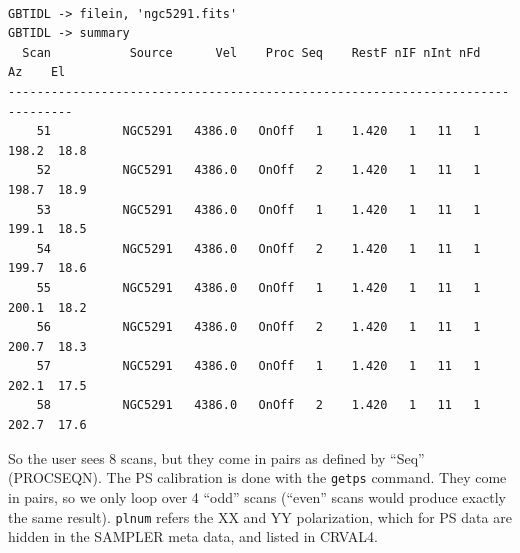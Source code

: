 \documentclass[12pt,a4paper]{article}
\begin{document}
\footnotesize
\begin{lstlisting}

GBTIDL -> filein, 'ngc5291.fits' 
GBTIDL -> summary
  Scan           Source      Vel    Proc Seq    RestF nIF nInt nFd     Az    El
-------------------------------------------------------------------------------
    51          NGC5291   4386.0   OnOff   1    1.420   1   11   1  198.2  18.8
    52          NGC5291   4386.0   OnOff   2    1.420   1   11   1  198.7  18.9
    53          NGC5291   4386.0   OnOff   1    1.420   1   11   1  199.1  18.5
    54          NGC5291   4386.0   OnOff   2    1.420   1   11   1  199.7  18.6
    55          NGC5291   4386.0   OnOff   1    1.420   1   11   1  200.1  18.2
    56          NGC5291   4386.0   OnOff   2    1.420   1   11   1  200.7  18.3
    57          NGC5291   4386.0   OnOff   1    1.420   1   11   1  202.1  17.5
    58          NGC5291   4386.0   OnOff   2    1.420   1   11   1  202.7  17.6
\end{lstlisting}
\normalsize

So the user sees 8 scans, but they come in pairs as defined by ``Seq'' (PROCSEQN).  The
PS calibration is done with the {\tt getps} command. They come in pairs, so we only
loop over 4 ``odd'' scans (``even'' scans would produce exactly the same result).
{\tt plnum} refers the XX and YY polarization, which for PS data are hidden in the SAMPLER
meta data, and listed in CRVAL4.
\end{document}
